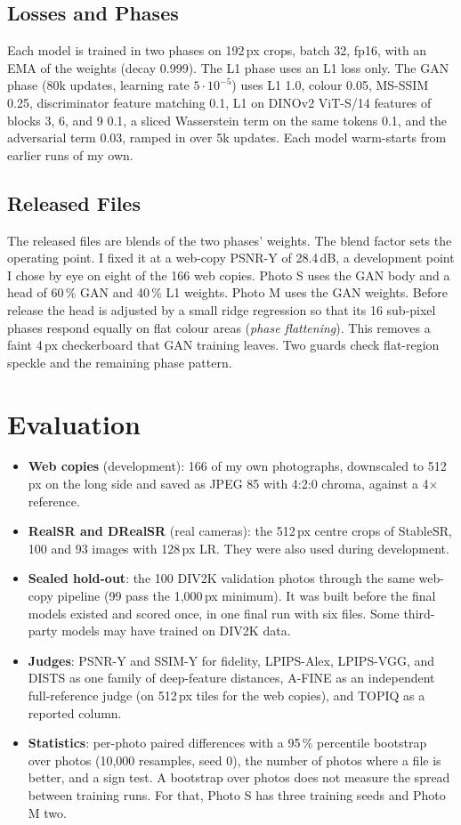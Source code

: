 \documentclass[conference]{IEEEtran}
\begin{document}
\subsection{Losses and Phases}
Each model is trained in two phases on 192\,px crops, batch 32, fp16, with an EMA of the weights (decay 0.999). The L1
phase uses an L1 loss only. The GAN phase (80k updates, learning rate $5\cdot10^{-5}$) uses L1 1.0, colour 0.05,
MS-SSIM 0.25, discriminator feature matching 0.1, L1 on DINOv2 ViT-S/14 features of blocks 3, 6, and 9 0.1, a sliced
Wasserstein term on the same tokens 0.1, and the adversarial term 0.03, ramped in over 5k updates. Each model
warm-starts from earlier runs of my own.

\subsection{Released Files}
The released files are blends of the two phases' weights. The blend factor sets the operating point. I fixed it at a
web-copy PSNR-Y of 28.4\,dB, a development point I chose by eye on eight of the 166 web copies. Photo S uses the GAN
body and a head of 60\,\% GAN and 40\,\% L1 weights. Photo M uses the GAN weights. Before release the head is adjusted by
a small ridge regression so that its 16 sub-pixel phases respond equally on flat colour areas (\emph{phase
flattening}). This removes a faint 4\,px checkerboard that GAN training leaves. Two guards check flat-region speckle
and the remaining phase pattern.

\section{Evaluation}

\begin{itemize}
\item \textbf{Web copies} (development): 166 of my own photographs, downscaled to 512\,px on the long side and saved
  as JPEG 85 with 4:2:0 chroma, against a 4$\times$ reference.
\item \textbf{RealSR and DRealSR} (real cameras): the 512\,px centre crops of StableSR, 100 and 93 images with
  128\,px LR. They were also used during development.
\item \textbf{Sealed hold-out}: the 100 DIV2K validation photos through the same web-copy pipeline (99 pass the
  1{,}000\,px minimum). It was built before the final models existed and scored once, in one final run with six files.
  Some third-party models may have trained on DIV2K data.
\item \textbf{Judges}: PSNR-Y and SSIM-Y for fidelity, LPIPS-Alex, LPIPS-VGG, and DISTS as one family of
  deep-feature distances, A-FINE as an independent full-reference judge (on 512\,px tiles for the web copies), and
  TOPIQ as a reported column.
\item \textbf{Statistics}: per-photo paired differences with a 95\,\% percentile bootstrap~\cite{bootstrap} over
  photos (10{,}000 resamples, seed 0), the number of photos where a file is better, and a sign test. A bootstrap over
  photos does not measure the spread between training runs. For that, Photo S has three training seeds and Photo M two.
\end{itemize}
\end{document}
